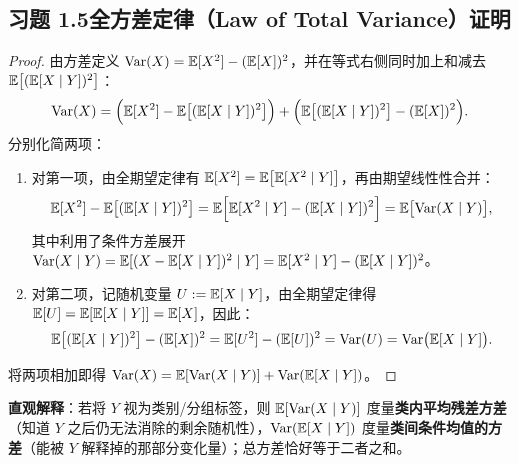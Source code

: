 \subsection*{习题 1.5\quad 全方差定律（Law of Total Variance）证明}
\begin{proof}
由方差定义 $\operatorname{Var}(X) = \mathbb{E}[X^2] - (\mathbb{E}[X])^2$，并在等式右侧同时加上和减去 $\mathbb{E}\bigl[(\mathbb{E}[X \mid Y])^2\bigr]$：
\[
  \operatorname{Var}(X) = \Bigl(\mathbb{E}[X^2] - \mathbb{E}\bigl[(\mathbb{E}[X \mid Y])^2\bigr]\Bigr)
          + \Bigl(\mathbb{E}\bigl[(\mathbb{E}[X \mid Y])^2\bigr] - (\mathbb{E}[X])^2\Bigr).
\]
分别化简两项：
\begin{enumerate}[label=(\arabic*), leftmargin=1.8em]
  \item 对第一项，由全期望定律有 $\mathbb{E}[X^2] = \mathbb{E}\bigl[\mathbb{E}[X^2 \mid Y]\bigr]$，再由期望线性性合并：
  \[
    \mathbb{E}[X^2] - \mathbb{E}\bigl[(\mathbb{E}[X \mid Y])^2\bigr]
    = \mathbb{E}\Bigl[\mathbb{E}[X^2 \mid Y] - (\mathbb{E}[X \mid Y])^2\Bigr]
    = \mathbb{E}\bigl[\operatorname{Var}(X \mid Y)\bigr],
  \]
  其中利用了条件方差展开 $\operatorname{Var}(X \mid Y) = \mathbb{E}[(X - \mathbb{E}[X\mid Y])^2 \mid Y] = \mathbb{E}[X^2 \mid Y] - (\mathbb{E}[X\mid Y])^2$。
  \item 对第二项，记随机变量 $U := \mathbb{E}[X \mid Y]$，由全期望定律得 $\mathbb{E}[U] = \mathbb{E}[\mathbb{E}[X \mid Y]] = \mathbb{E}[X]$，因此：
  \[
    \mathbb{E}\bigl[(\mathbb{E}[X \mid Y])^2\bigr] - (\mathbb{E}[X])^2 = \mathbb{E}[U^2] - (\mathbb{E}[U])^2 = \operatorname{Var}(U) = \operatorname{Var}\bigl(\mathbb{E}[X \mid Y]\bigr).
  \]
\end{enumerate}
将两项相加即得 $\operatorname{Var}(X) = \mathbb{E}[\operatorname{Var}(X \mid Y)] + \operatorname{Var}(\mathbb{E}[X \mid Y])$。
\end{proof}
\textbf{直观解释}：若将 $Y$ 视为类别/分组标签，则 $\mathbb{E}[\operatorname{Var}(X \mid Y)]$ 度量\textbf{类内平均残差方差}（知道 $Y$ 之后仍无法消除的剩余随机性），$\operatorname{Var}(\mathbb{E}[X \mid Y])$ 度量\textbf{类间条件均值的方差}（能被 $Y$ 解释掉的那部分变化量）；总方差恰好等于二者之和。


